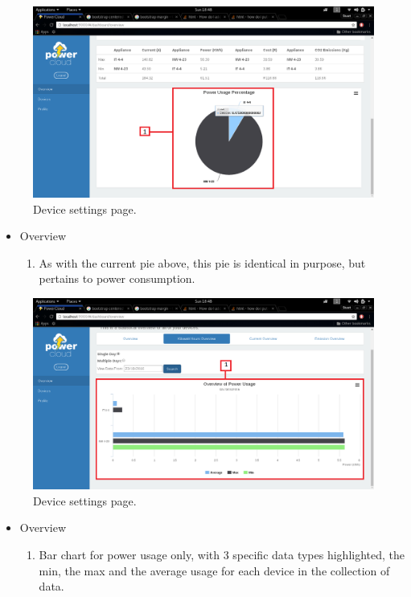 \documentclass[a4paper,10pt]{article}
\begin{document}
		\begin{figure}[H]
			\includegraphics[width=\textwidth]{images/Overview_PowerPie.png}
			\caption{Device settings page. \label{overflow}}
		\end{figure}
		\begin{itemize}
			\item Overview
			\begin{enumerate}
				\item As with the current pie above, this pie is identical in purpose, but pertains to power consumption.
			\end{enumerate}
		\end{itemize}
		
		\begin{figure}[H]
			\includegraphics[width=\textwidth]{images/Overview_PowerBar.png}
			\caption{Device settings page. \label{overflow}}
		\end{figure}
		\begin{itemize}
			\item Overview
			\begin{enumerate}
				\item Bar chart for power usage only, with 3 specific data types highlighted, the 
				min, the max and the average usage for each device in the collection of data.
			\end{enumerate}
		\end{itemize}
		
\end{document}
